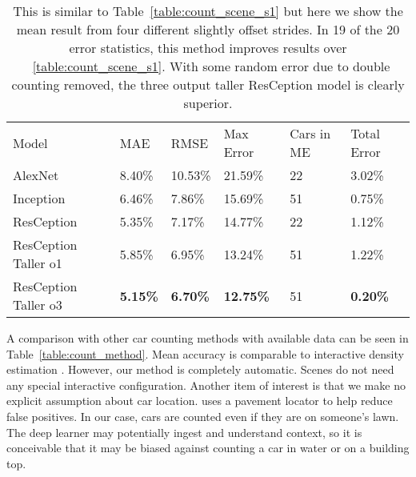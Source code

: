 \documentclass[runningheads]{llncs}
\begin{document}
\setlength{\tabcolsep}{4pt}
\begin{table}
\begin{center}
\caption{ This is similar to Table~\ref{table:count_scene_s1} but here we show the mean result from four different slightly offset strides. In 19 of the 20 error statistics, this method improves results over  ~\ref{table:count_scene_s1}. With some random error due to double counting removed, the three output taller ResCeption model is clearly superior.  }
\label{table:count_scene_s4}
\begin{tabular}{llllll}
\hline\noalign{\smallskip}
Model & MAE & RMSE & Max Error & Cars in ME & Total Error\\
\noalign{\smallskip}
\hline
\noalign{\smallskip}
AlexNet & 8.40\% & 10.53\% & 21.59\% & 22 & 3.02\%\\
Inception & 6.46\% & 7.86\% & 15.69\% & 51 & 0.75\%\\
ResCeption & 5.35\% & 7.17\% & 14.77\% & 22 & 1.12\%\\
ResCeption Taller o1 & 5.85\% & 6.95\% & 13.24\% & 51 & 1.22\%\\
ResCeption Taller o3 & {\bf 5.15\%} & {\bf 6.70\%} & {\bf 12.75\%} & 51 & {\bf 0.20\%}\\
\hline
\end{tabular}
\end{center}
\end{table}
\setlength{\tabcolsep}{1.4pt}

A comparison with other car counting methods with available data can be seen in Table~\ref{table:count_method}. Mean accuracy is comparable to interactive density estimation \cite{Arteta14}. However, our method is completely automatic. Scenes do not need any special interactive configuration. Another item of interest is that we make no explicit assumption about car location. \cite{Kamenetsky15} uses a pavement locator to help reduce false positives. In our case, cars are counted even if they are on someone's lawn. The deep learner may potentially ingest and understand context, so it is conceivable that it may be biased against counting a car in water or on a building top.
\end{document}
